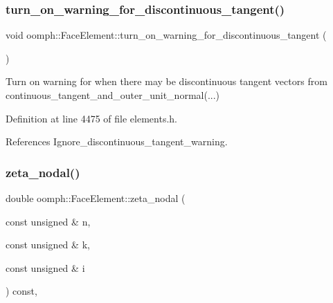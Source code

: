 \mbox{\label{classoomph_1_1FaceElement_a025b2cae37ba7d8067bf87f885cd11f5}} 
\subsubsection{\texorpdfstring{turn\+\_\+on\+\_\+warning\+\_\+for\+\_\+discontinuous\+\_\+tangent()}{turn\_on\_warning\_for\_discontinuous\_tangent()}}
{\footnotesize\ttfamily void oomph\+::\+Face\+Element\+::turn\+\_\+on\+\_\+warning\+\_\+for\+\_\+discontinuous\+\_\+tangent (\begin{DoxyParamCaption}{ }\end{DoxyParamCaption})\hspace{0.3cm}{\ttfamily [inline]}}



Turn on warning for when there may be discontinuous tangent vectors from continuous\+\_\+tangent\+\_\+and\+\_\+outer\+\_\+unit\+\_\+normal(...) 



Definition at line 4475 of file elements.\+h.



References Ignore\+\_\+discontinuous\+\_\+tangent\+\_\+warning.

\mbox{\label{classoomph_1_1FaceElement_a58c9f93705c7741f76c8487d152e68a6}} 
\subsubsection{\texorpdfstring{zeta\+\_\+nodal()}{zeta\_nodal()}}
{\footnotesize\ttfamily double oomph\+::\+Face\+Element\+::zeta\+\_\+nodal (\begin{DoxyParamCaption}\item[{const unsigned \&}]{n,  }\item[{const unsigned \&}]{k,  }\item[{const unsigned \&}]{i }\end{DoxyParamCaption}) const\hspace{0.3cm}{\ttfamily [inline]}, {\ttfamily [virtual]}}



